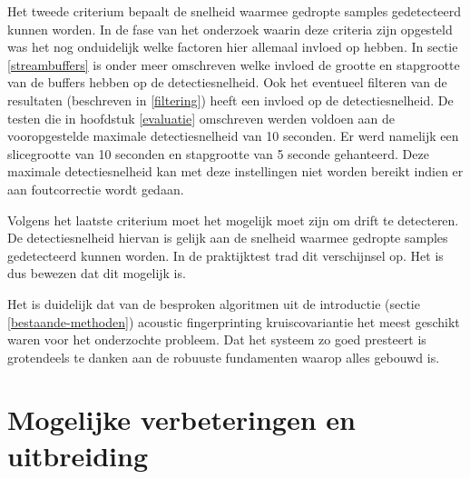 Het tweede criterium bepaalt de snelheid waarmee gedropte samples gedetecteerd kunnen worden. In de fase van het onderzoek waarin deze criteria zijn opgesteld was het nog onduidelijk welke factoren hier allemaal invloed op hebben. In sectie \ref{streambuffers} is onder meer omschreven welke invloed de grootte en stapgrootte van de buffers hebben op de detectiesnelheid. Ook het eventueel filteren van de resultaten (beschreven in \ref{filtering}) heeft een invloed op de detectiesnelheid. De testen die in hoofdstuk \ref{evaluatie} omschreven werden voldoen aan de vooropgestelde maximale detectiesnelheid van 10 seconden. Er werd namelijk een slicegrootte van 10 seconden en stapgrootte van 5 seconde gehanteerd. Deze maximale detectiesnelheid kan met deze instellingen niet worden bereikt indien er aan foutcorrectie wordt gedaan.

Volgens het laatste criterium moet het mogelijk moet zijn om drift te detecteren. De detectiesnelheid hiervan is gelijk aan de snelheid waarmee gedropte samples gedetecteerd kunnen worden. In de praktijktest trad dit verschijnsel op. Het is dus bewezen dat dit mogelijk is.

Het is duidelijk dat van de besproken algoritmen uit de introductie (sectie \ref{bestaande-methoden}) acoustic fingerprinting kruiscovariantie het meest geschikt waren voor het onderzochte probleem. Dat het systeem zo goed presteert is grotendeels te danken aan de robuuste fundamenten waarop alles gebouwd is.

\section{Mogelijke verbeteringen en uitbreiding}

